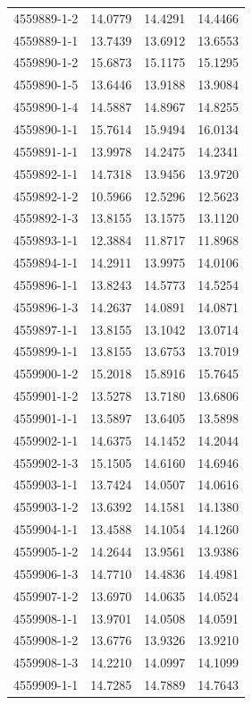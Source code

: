 \begin{longtable}{lrrr}
4559889-1-2 & 14.0779 & 14.4291 & 14.4466 \\
4559889-1-1 & 13.7439 & 13.6912 & 13.6553 \\
4559890-1-2 & 15.6873 & 15.1175 & 15.1295 \\
4559890-1-5 & 13.6446 & 13.9188 & 13.9084 \\
4559890-1-4 & 14.5887 & 14.8967 & 14.8255 \\
4559890-1-1 & 15.7614 & 15.9494 & 16.0134 \\
4559891-1-1 & 13.9978 & 14.2475 & 14.2341 \\
4559892-1-1 & 14.7318 & 13.9456 & 13.9720 \\
4559892-1-2 & 10.5966 & 12.5296 & 12.5623 \\
4559892-1-3 & 13.8155 & 13.1575 & 13.1120 \\
4559893-1-1 & 12.3884 & 11.8717 & 11.8968 \\
4559894-1-1 & 14.2911 & 13.9975 & 14.0106 \\
4559896-1-1 & 13.8243 & 14.5773 & 14.5254 \\
4559896-1-3 & 14.2637 & 14.0891 & 14.0871 \\
4559897-1-1 & 13.8155 & 13.1042 & 13.0714 \\
4559899-1-1 & 13.8155 & 13.6753 & 13.7019 \\
4559900-1-2 & 15.2018 & 15.8916 & 15.7645 \\
4559901-1-2 & 13.5278 & 13.7180 & 13.6806 \\
4559901-1-1 & 13.5897 & 13.6405 & 13.5898 \\
4559902-1-1 & 14.6375 & 14.1452 & 14.2044 \\
4559902-1-3 & 15.1505 & 14.6160 & 14.6946 \\
4559903-1-1 & 13.7424 & 14.0507 & 14.0616 \\
4559903-1-2 & 13.6392 & 14.1581 & 14.1380 \\
4559904-1-1 & 13.4588 & 14.1054 & 14.1260 \\
4559905-1-2 & 14.2644 & 13.9561 & 13.9386 \\
4559906-1-3 & 14.7710 & 14.4836 & 14.4981 \\
4559907-1-2 & 13.6970 & 14.0635 & 14.0524 \\
4559908-1-1 & 13.9701 & 14.0508 & 14.0591 \\
4559908-1-2 & 13.6776 & 13.9326 & 13.9210 \\
4559908-1-3 & 14.2210 & 14.0997 & 14.1099 \\
4559909-1-1 & 14.7285 & 14.7889 & 14.7643 \\

\end{longtable}
